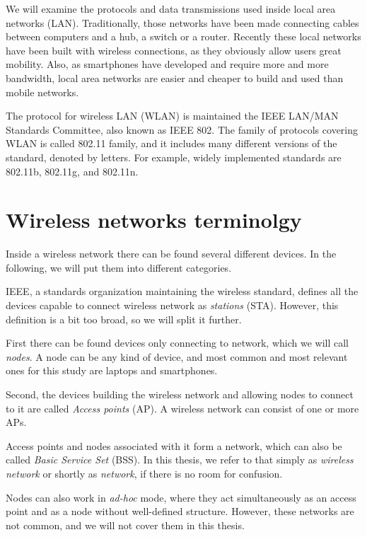 \documentclass[12pt,a4paper,oneside,pdftex]{report}
\begin{document}
We will examine the protocols and data transmissions used inside local area networks (LAN). Traditionally, those networks have been made connecting cables between computers and a hub, a switch or a router. Recently these local networks have been built with wireless connections, as they obviously allow users great mobility. Also, as smartphones have developed and require more and more bandwidth, local area networks are easier and cheaper to build and used than mobile networks.

The protocol for wireless LAN (WLAN) is maintained the IEEE LAN/MAN Standards Committee, also known as IEEE 802. The family of protocols covering WLAN is called 802.11 family, and it includes many different versions of the standard, denoted by letters. For example, widely implemented standards are 802.11b, 802.11g, and 802.11n. \cite{IEEE802.11}


\section{Wireless networks terminolgy}
\label{sec:terminology}

Inside a wireless network there can be found several different devices. In the following, we will put them into different categories.

IEEE, a standards organization maintaining the wireless standard, defines all the devices capable to connect wireless network as \emph{stations} (STA). However, this definition is a bit too broad, so we will split it further.

First there can be found devices only connecting to network, which we will call \emph{nodes}. A node can be any kind of device, and most common and most relevant ones for this study are laptops and smartphones. 

Second, the devices building the wireless network and allowing nodes to connect to it are called \emph{Access points} (AP). A wireless network can consist of one or more APs.

Access points and nodes associated with it form a network, which can also be called \emph{Basic Service Set} (BSS). In this thesis, we refer to that simply as \emph{wireless network} or shortly as \emph{network}, if there is no room for confusion.

Nodes can also work in \emph{ad-hoc} mode, where they act simultaneously as an access point and as a node without well-defined structure. However, these networks are not common, and we will not cover them in this thesis.
\end{document}
